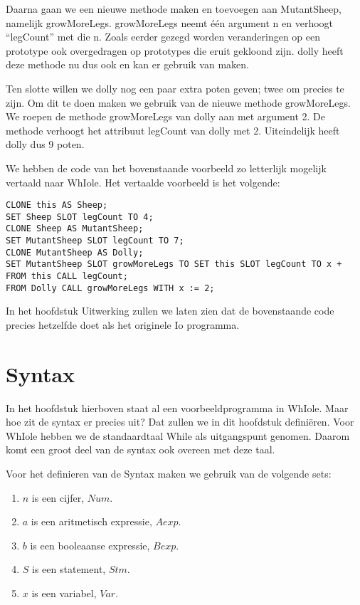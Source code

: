 \documentclass[12pt]{article}
\begin{document}
Daarna gaan we een nieuwe methode maken en toevoegen aan MutantSheep, namelijk growMoreLegs.
growMoreLegs neemt één argument n en verhoogt ``legCount'' met die n. 
Zoals eerder gezegd worden veranderingen op een prototype ook overgedragen op prototypes die eruit gekloond zijn. dolly heeft deze methode nu dus ook en kan er gebruik van maken.\newline

Ten slotte willen we dolly nog een paar extra poten geven; twee om precies te zijn.
Om dit te doen maken we gebruik van de nieuwe methode growMoreLegs.
We roepen de methode growMoreLegs van dolly aan met argument 2.
De methode verhoogt het attribuut legCount van dolly met 2.
Uiteindelijk heeft dolly dus 9 poten.

We hebben de code van het bovenstaande voorbeeld zo letterlijk mogelijk vertaald naar WhIole.
Het vertaalde voorbeeld is het volgende:
\begin{lstlisting}[frame=single]
CLONE this AS Sheep;
SET Sheep SLOT legCount TO 4;
CLONE Sheep AS MutantSheep;
SET MutantSheep SLOT legCount TO 7;
CLONE MutantSheep AS Dolly;
SET MutantSheep SLOT growMoreLegs TO SET this SLOT legCount TO x + FROM this CALL legCount;
FROM Dolly CALL growMoreLegs WITH x := 2;
\end{lstlisting}
In het hoofdstuk Uitwerking zullen we laten zien dat de bovenstaande code precies hetzelfde doet als het originele Io programma.

\pagebreak
\section{Syntax}
In het hoofdstuk hierboven staat al een voorbeeldprogramma in WhIole. Maar hoe zit de syntax er precies uit? Dat zullen we in dit hoofdstuk definiëren. Voor WhIole hebben we de standaardtaal While als uitgangspunt genomen. Daarom komt een groot deel van de syntax ook overeen met deze taal.

Voor het definieren van de Syntax maken we gebruik van de volgende sets: 
\begin{enumerate}[noitemsep]
	\item[] $n$ is een cijfer, $Num$.
	\item[] $a$ is een aritmetisch expressie, $Aexp$.
	\item[] $b$ is een booleaanse expressie, $Bexp$. 
	\item[] $S$ is een statement, $Stm$. 
	\item[] $x$ is een variabel, $Var$. 
\end{enumerate}	 
\end{document}
